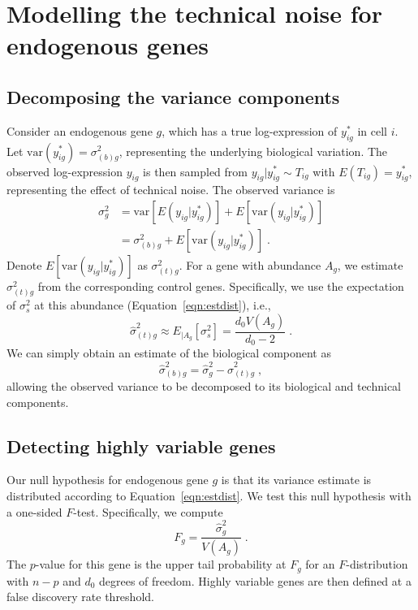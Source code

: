 \documentclass{article}
\begin{document}
\section{Modelling the technical noise for endogenous genes}

\subsection{Decomposing the variance components}
Consider an endogenous gene $g$, which has a true log-expression of $y_{ig}^*$ in cell $i$.
Let $\mbox{var}(y_{ig}^*) = \sigma^2_{(b)g}$, representing the underlying biological variation.
The observed log-expression $y_{ig}$ is then sampled from $y_{ig}|y_{ig}^* \sim T_{ig}$ with $E(T_{ig}) = y^*_{ig}$, representing the effect of technical noise.
The observed variance is 
\begin{align*}
    \sigma^2_g &= \mbox{var}[E(y_{ig}|y_{ig}^*)] + E[\mbox{var}(y_{ig}|y_{ig}^*)] \\
               &= \sigma^2_{(b)g} +  E[\mbox{var}(y_{ig}|y_{ig}^*)]  \;.
\end{align*}
Denote $E[\mbox{var}(y_{ig}|y_{ig}^*)]$ as $\sigma^2_{(t)g}$.
For a gene with abundance $A_g$, we estimate $\sigma^2_{(t)g}$ from the corresponding control genes.
Specifically, we use the expectation of $\sigma^2_s$ at this abundance (Equation~\ref{eqn:estdist}), i.e., 
\begin{equation}
    \hat\sigma^2_{(t)g} \approx E_{|A_g}[\sigma^2_s] = \frac{d_0V(A_g)}{d_0-2} \;. \label{eqn:techest}
\end{equation}
We can simply obtain an estimate of the biological component as
\[
    \hat\sigma^2_{(b)g} = \hat\sigma^2_g - \hat\sigma^2_{(t)g} \;,
\]
allowing the observed variance to be decomposed to its biological and technical components.

\subsection{Detecting highly variable genes}
Our null hypothesis for endogenous gene $g$ is that its variance estimate is distributed according to Equation~\ref{eqn:estdist}.
We test this null hypothesis with a one-sided $F$-test.
Specifically, we compute
\[
    F_g = \frac{\hat\sigma^2_g}{V(A_g)} \;.
\]
The $p$-value for this gene is the upper tail probability at $F_g$ for an $F$-distribution with $n-p$ and $d_0$ degrees of freedom.
Highly variable genes are then defined at a false discovery rate threshold.
\end{document}

